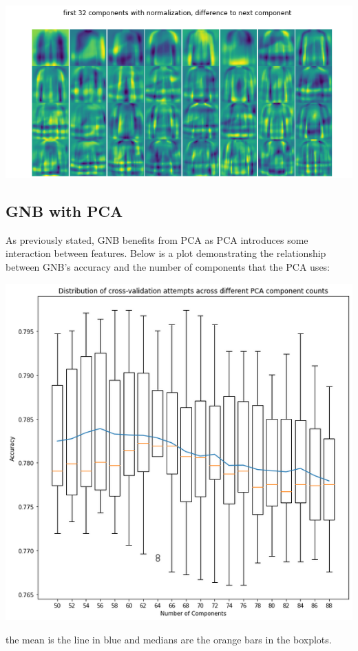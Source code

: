 \documentclass[11pt]{article}
\begin{document}
\begin{center}
\includegraphics[width=.9\linewidth]{.images/Experimentation_and_Results/2020-10-21_20-36-09_screenshot.png}
\end{center}

\subsection{GNB with PCA}
\label{sec:org0034792}
As previously stated, GNB benefits from PCA as PCA introduces some interaction between features. Below is a plot demonstrating the relationship between GNB's accuracy and the number of components that the PCA uses:
\begin{center}
\includegraphics[width=.9\linewidth]{.images/Experimentation_and_Results/2020-10-21_20-39-46_screenshot.png}
\end{center}
the mean is the line in blue and medians are the orange bars in the boxplots.
\end{document}
